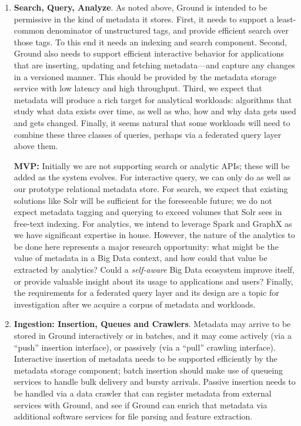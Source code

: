 \begin{enumerate}
\item \textbf{Search, Query, Analyze}.  As noted above, Ground is intended to be permissive in the kind of metadata it stores.  First, it needs to support a least-common denominator of unstructured tags, and provide efficient search over those tags.  To this end it needs an indexing and search component.  Second, Ground also needs to support efficient interactive behavior for applications that are inserting, updating and fetching metadata---and capture any changes in a versioned manner.  This should be provided by the metadata storage service with low latency and high throughput.  Third, we expect that metadata will produce a rich target for analytical workloads: algorithms that study what data exists over time, as well as who, how and why data gets used and gets changed.  Finally, it seems natural that some workloads will need to combine these three classes of queries, perhaps via a federated query layer above them. 

\textbf{MVP:} Initially we are not supporting search or analytic APIs; these will be added as the system evolves.  For interactive query, we can only do as well as our prototype relational metadata store.  For search, we expect that existing solutions like Solr will be sufficient for the foreseeable future; we do not expect metadata tagging and querying to exceed volumes that Solr sees in free-text indexing. For analytics, we intend to leverage Spark and GraphX as we have significant expertise in house.  However, the nature of the analytics to be done here represents a major research opportunity: what might be the value of metadata in a Big Data context, and how could that value be extracted by analytics?  Could a \emph{self-aware} Big Data ecosystem improve itself, or provide valuable insight about its usage to applications and users?    Finally, the requirements for a federated query layer and its design are a topic for investigation after we acquire a corpus of metadata and workloads.

\item \textbf{Ingestion: Insertion, Queues and Crawlers}.  Metadata may arrive to be stored in Ground interactively or in batches, and it may come actively (via a ``push'' insertion interface), or passively (via a ``pull'' crawling interface).  Interactive insertion of metadata needs to be supported efficiently by the metadata storage component; batch insertion should make use of queueing services to handle bulk delivery and bursty arrivals.  Passive insertion needs to be handled via a data crawler that can register metadata from external services with Ground, and see if Ground can enrich that metadata via additional software services for file parsing and feature extraction.


\end{enumerate}
